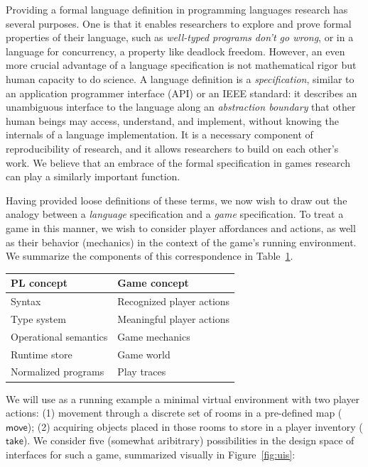   Providing a formal language definition in programming languages research
  has several purposes. One is that it enables researchers to explore
  and prove formal properties of their language, such as {\em well-typed
  programs don't go wrong}, or in a language for concurrency, a property
  like deadlock freedom. However, an even more crucial advantage of a
  language specification is not mathematical rigor but human capacity to do
  science. A language definition is a {\em specification}, similar to an
  application programmer interface (API) or an IEEE standard: it describes
  an unambiguous interface to the language along an {\em abstraction
  boundary} that other human beings may access, understand, and implement,
  without knowing the internals of a language implementation.  It is a
  necessary component of reproducibility of research, and it allows
  researchers to build on each other's work. We believe that an embrace of
  the formal specification in games research can play a similarly important
  function.

  Having provided loose definitions of these terms, we now wish to draw out
  the analogy between a {\em language} specification and a {\em game}
  specification. To treat a game in this manner, we wish to consider player
  affordances and actions, as well as their behavior (mechanics) in the
  context of the game's running environment. We summarize the components of
  this correspondence in Table~\ref{tab:correspondence}.

  \begin{table}
  \begin{tabular}{ll}
    PL concept & Game concept\\
    \hline
    Syntax & Recognized player actions \\
    Type system & Meaningful player actions \\
    Operational semantics & Game mechanics \\
    Runtime store & Game world \\
    Normalized programs & Play traces 
  \end{tabular}
  \label{tab:correspondence}
  \end{table}

  \newcommand{\cmove}{\mathsf{move}}
  \newcommand{\ctake}{\mathsf{take}}
  \newcommand{\ccollect}{\mathsf{collect}}

  We will use as a running example a minimal virtual environment with two
  player actions: (1) movement through a discrete set of rooms in a
  pre-defined map ($\cmove$); (2) acquiring objects placed in those rooms to store in
  a player inventory ($\ctake$).  We consider five (somewhat aribitrary)
  possibilities in the design space of interfaces for such a game,
  summarized visually in Figure~\ref{fig:uis}:

